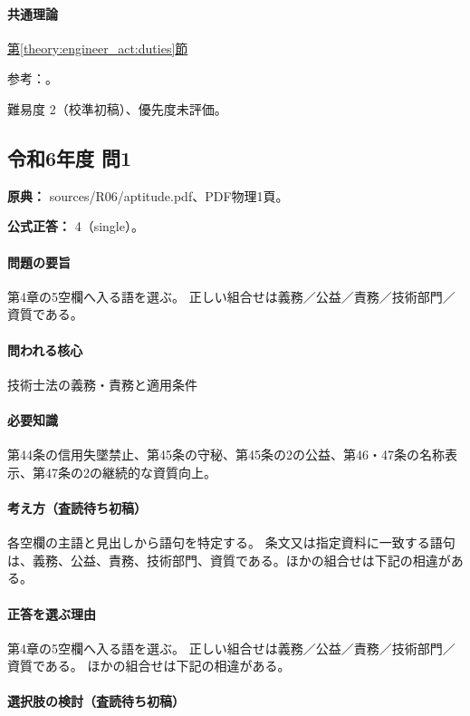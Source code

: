 \paragraph{共通理論} \hyperref[theory:engineer_act:duties]{第\ref*{theory:engineer_act:duties}節}

\par 参考：\cite{engineer_act_current}。

\par 難易度 2（校準初稿）、優先度未評価。

\subsection{令和6年度 問1}
\label{q:r06-reg-apt-01}

\noindent\textbf{原典：} sources/R06/aptitude.pdf、PDF物理1頁。

\textbf{公式正答：} 4（single）。

\paragraph{問題の要旨} 第4章の5空欄へ入る語を選ぶ。 正しい組合せは義務／公益／責務／技術部門／資質である。

\paragraph{問われる核心} 技術士法の義務・責務と適用条件

\paragraph{必要知識} 第44条の信用失墜禁止、第45条の守秘、第45条の2の公益、第46・47条の名称表示、第47条の2の継続的な資質向上。

\paragraph{考え方（査読待ち初稿）} 各空欄の主語と見出しから語句を特定する。 条文又は指定資料に一致する語句は、義務、公益、責務、技術部門、資質である。ほかの組合せは下記の相違がある。

\paragraph{正答を選ぶ理由} 第4章の5空欄へ入る語を選ぶ。 正しい組合せは義務／公益／責務／技術部門／資質である。 ほかの組合せは下記の相違がある。

\paragraph{選択肢の検討（査読待ち初稿）}\mbox{}\par

